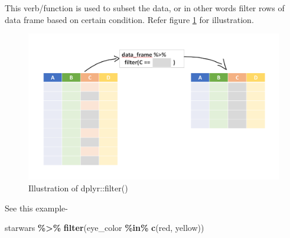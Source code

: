 \documentclass[
]{book}
\newenvironment{Shaded}{\begin{snugshade}}{\end{snugshade}}
\newcommand{\FunctionTok}[1]{\textcolor[rgb]{0.13,0.29,0.53}{\textbf{#1}}}
\newcommand{\NormalTok}[1]{#1}
\newcommand{\SpecialCharTok}[1]{\textcolor[rgb]{0.81,0.36,0.00}{\textbf{#1}}}
\newcommand{\StringTok}[1]{\textcolor[rgb]{0.31,0.60,0.02}{#1}}
\begin{document}
This verb/function is used to subset the data, or in other words filter rows of data frame based on certain condition. Refer figure \ref{fig:filterr} for illustration.

\begin{figure}

{\centering \includegraphics[width=0.99\linewidth]{images/filter_dplyr} 

}

\caption{Illustration of dplyr::filter()}\label{fig:filterr}
\end{figure}

See this example-

\begin{Shaded}
\begin{Highlighting}[]
\NormalTok{starwars }\SpecialCharTok{\%\textgreater{}\%} 
  \FunctionTok{filter}\NormalTok{(eye\_color }\SpecialCharTok{\%in\%} \FunctionTok{c}\NormalTok{(}\StringTok{\textquotesingle{}red\textquotesingle{}}\NormalTok{, }\StringTok{\textquotesingle{}yellow\textquotesingle{}}\NormalTok{))}
\end{Highlighting}
\end{Shaded}
\end{document}
